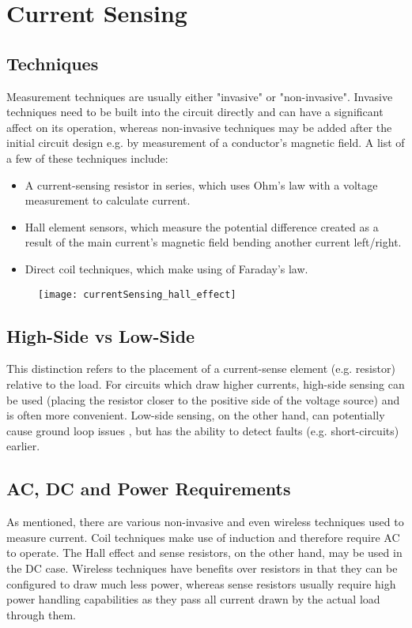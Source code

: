 \graphicspath{{content/1_literatureReview/figures/}}
\section{Current Sensing}

\subsection{Techniques}
Measurement techniques are usually either "invasive" or "non-invasive". Invasive techniques need to be built into the circuit directly and can have a significant affect
on its operation, whereas non-invasive techniques may be added after the initial circuit design e.g. by measurement of a conductor's magnetic field.
A list of a few of these techniques \cite{currentSenseMethods} include:
\begin{itemize}
    \item A current-sensing resistor in series, which uses Ohm's law with a voltage measurement to calculate current.
    \item Hall element sensors, which measure the potential difference created as a result of the main current's magnetic field bending another current left/right.
    \item Direct coil techniques, which make using of Faraday's law.
\end{itemize}

\begin{figure}[h!]
    \centering
    \texttt{[image: currentSensing\_hall\_effect]}
    \label{fig:hall-effect}
  \end{figure}

\subsection{High-Side vs Low-Side}
This distinction refers to the placement of a current-sense element (e.g. resistor) relative to the load. For circuits which draw higher currents, high-side sensing can be used
(placing the resistor closer to the positive side of the voltage source) and is often more convenient. Low-side sensing, on the other hand, can potentially cause ground loop
issues \cite{currentSenseLowHighSide}, but has the ability to detect faults (e.g. short-circuits) earlier.

\subsection{AC, DC and Power Requirements}
As mentioned, there are various non-invasive and even wireless techniques used to measure current. Coil techniques make use of induction and therefore require AC to operate.
The Hall effect and sense resistors, on the other hand, may be used in the DC case. Wireless techniques have benefits over resistors in that they can be configured to draw much less power,
whereas sense resistors usually require high power handling capabilities as they pass all current drawn by the actual load through them.

